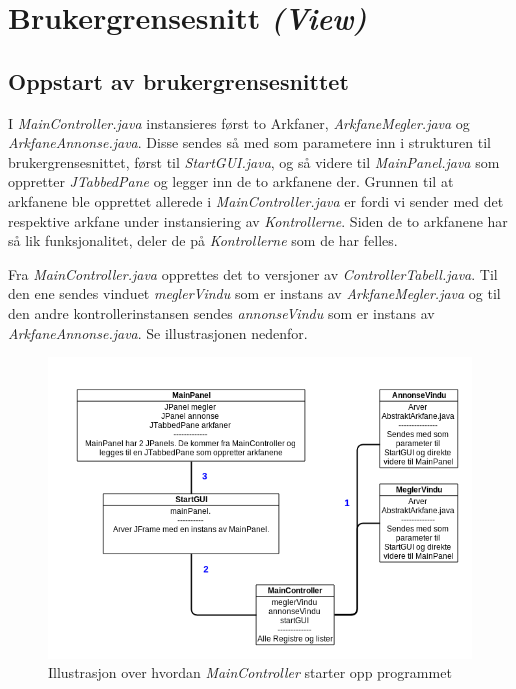 \section{Brukergrensesnitt \emph{(View)}} \label{sec:brukergrensesnitt}

\subsection{Oppstart av brukergrensesnittet}
I \emph{MainController.java} instansieres først to Arkfaner, \emph{ArkfaneMegler.java} og \emph{ArkfaneAnnonse.java}.
Disse sendes så med som parametere inn i strukturen til brukergrensesnittet, først til \emph{StartGUI.java}, og så videre til \emph{MainPanel.java} som oppretter \emph{JTabbedPane} og legger inn de to arkfanene der.
Grunnen til at arkfanene ble opprettet allerede i \emph{MainController.java} er fordi vi sender med det respektive arkfane under instansiering av \emph{Kontrollerne}. 
Siden de to arkfanene har så lik funksjonalitet, deler de på \emph{Kontrollerne} som de har felles.

Fra \emph{MainController.java} opprettes det to versjoner av \emph{ControllerTabell.java}. Til den ene sendes vinduet \emph{meglerVindu} som er instans av \emph{ArkfaneMegler.java} og til den andre kontrollerinstansen sendes \emph{annonseVindu} som er instans av \emph{ArkfaneAnnonse.java}.
Se illustrasjonen nedenfor.
\begin{figure}[ht]
\includegraphics[width=\textwidth,height=\textheight,keepaspectratio]{./img/produktdokumentasjon/bilder/Controller_og_GUI-opprettelse2.png}
\caption{Illustrasjon over hvordan \emph{MainController} starter opp programmet}
\end{figure}

